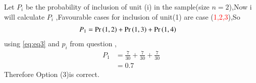 \documentclass[journal,12pt,twocolumn]{IEEEtran}
\begin{document}
\begin{table}[h!]
  \caption{ list of samples}
  \label{tab:label1_test}
\end{table}
Let $P_{i}$ be the probability of inclusion of unit (i) in the sample(size $n=2$),Now i will calculate $P_{i}$ ,Favourable cases for inclusion of unit(1) are case (\textcolor{red}{1,2,3}),So
\begin{align}
    P_{1}&=\Pr\left(1,2\right) +\Pr\left(1,3\right)+\Pr\left(1,4\right)
\end{align}
using \eqref{eq:eq3} and $p_{i}$ from question ,
\begin{align}
    P_{1}&=\frac{7}{30} + \frac{7}{30} + \frac{7}{30}
    \\
    &=0.7
\end{align}
Therefore Option (3)is correct.
\end{document}

